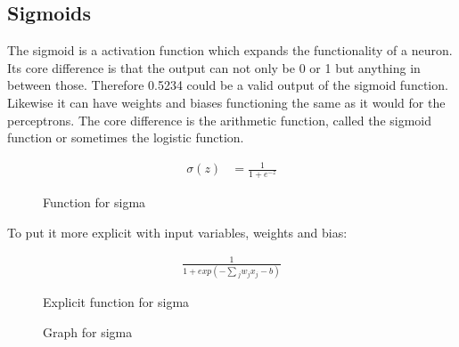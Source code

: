 \subsection{Sigmoids}
The sigmoid is a activation function which expands the functionality of a neuron. Its core difference is that the output can not only be 0 or 1
but anything in between those. Therefore 0.5234 could be a valid output of the sigmoid function. Likewise it can
have weights and biases functioning the same as it would for the perceptrons.
The core difference is the arithmetic function, called the sigmoid function or sometimes the logistic function.
\begin{figure}[hbt!]
    \begin{equation*}
        \begin{split}
            \sigma(z) & = \frac{1}{1+e^{-z}}
        \end{split}
    \end{equation*} 
    \caption{Function for sigma}
\end{figure}
\vspace{0.25cm}
To put it more explicit with input variables, weights and bias:
\begin{figure}[hbt!]
    \begin{equation*}
        \begin{split}
            \frac{1}{1+exp(-\sum{_j}{w_jx_j-b})}
        \end{split}
    \end{equation*}
    \caption{Explicit function for sigma}
\end{figure}
\vspace{0.25cm}
\begin{figure}[hbt!]
\begin{center}
    \caption{Graph for sigma}
\end{center}
\end{figure}

